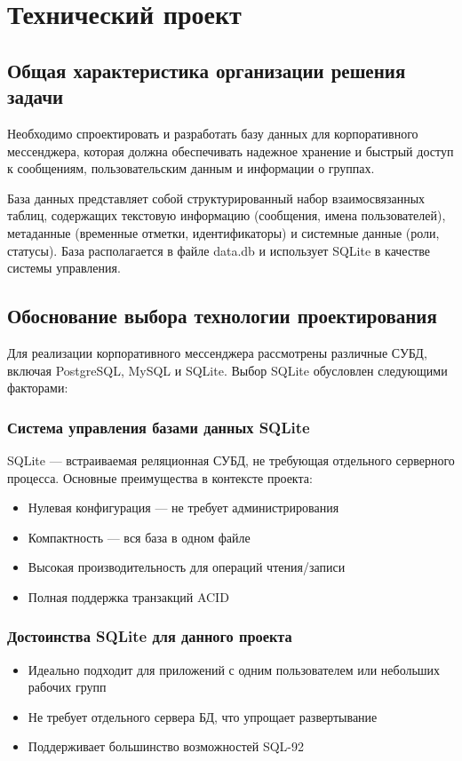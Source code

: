 \section{Технический проект}
\subsection{Общая характеристика организации решения задачи}

Необходимо спроектировать и разработать базу данных для корпоративного мессенджера, которая должна обеспечивать надежное хранение и быстрый доступ к сообщениям, пользовательским данным и информации о группах.

База данных представляет собой структурированный набор взаимосвязанных таблиц, содержащих текстовую информацию (сообщения, имена пользователей), метаданные (временные отметки, идентификаторы) и системные данные (роли, статусы). База располагается в файле data.db и использует SQLite в качестве системы управления.

\subsection{Обоснование выбора технологии проектирования}

Для реализации корпоративного мессенджера рассмотрены различные СУБД, включая PostgreSQL, MySQL и SQLite. Выбор SQLite обусловлен следующими факторами:

\subsubsection{Система управления базами данных SQLite}

SQLite — встраиваемая реляционная СУБД, не требующая отдельного серверного процесса. Основные преимущества в контексте проекта:

\begin{itemize}
	\item Нулевая конфигурация — не требует администрирования
	\item Компактность — вся база в одном файле
	\item Высокая производительность для операций чтения/записи
	\item Полная поддержка транзакций ACID
\end{itemize}

\subsubsection{Достоинства SQLite для данного проекта}
\begin{itemize}
	\item Идеально подходит для приложений с одним пользователем или небольших рабочих групп
	\item Не требует отдельного сервера БД, что упрощает развертывание
	\item Поддерживает большинство возможностей SQL-92
\end{itemize}

